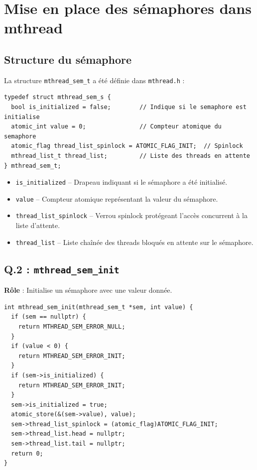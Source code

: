 \documentclass[12pt,a4paper]{article}
\begin{document}
\section{Mise en place des sémaphores dans mthread}

\subsection*{Structure du sémaphore}

La structure \texttt{mthread\_sem\_t} a été définie dans \texttt{mthread.h} :

\begin{lstlisting}
typedef struct mthread_sem_s {
  bool is_initialized = false;        // Indique si le semaphore est initialise
  atomic_int value = 0;               // Compteur atomique du semaphore
  atomic_flag thread_list_spinlock = ATOMIC_FLAG_INIT;  // Spinlock
  mthread_list_t thread_list;         // Liste des threads en attente
} mthread_sem_t;
\end{lstlisting}

\begin{itemize}
  \item \texttt{is\_initialized} -- Drapeau indiquant si le sémaphore a été initialisé.
  \item \texttt{value} -- Compteur atomique représentant la valeur du sémaphore.
  \item \texttt{thread\_list\_spinlock} -- Verrou spinlock protégeant l'accès concurrent à la liste d'attente.
  \item \texttt{thread\_list} -- Liste chaînée des threads bloqués en attente sur le sémaphore.
\end{itemize}

\subsection*{Q.2 : \texttt{mthread\_sem\_init}}

\textbf{Rôle} : Initialise un sémaphore avec une valeur donnée.

\begin{lstlisting}
int mthread_sem_init(mthread_sem_t *sem, int value) {
  if (sem == nullptr) {
    return MTHREAD_SEM_ERROR_NULL;
  }
  if (value < 0) {
    return MTHREAD_SEM_ERROR_INIT;
  }
  if (sem->is_initialized) {
    return MTHREAD_SEM_ERROR_INIT;
  }
  sem->is_initialized = true;
  atomic_store(&(sem->value), value);
  sem->thread_list_spinlock = (atomic_flag)ATOMIC_FLAG_INIT;
  sem->thread_list.head = nullptr;
  sem->thread_list.tail = nullptr;
  return 0;
}
\end{lstlisting}
\end{document}
